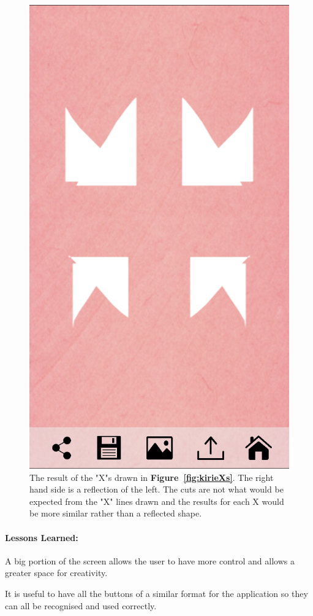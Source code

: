 \documentclass[11pt]{article}
\begin{document}
\begin{figure}[!ht]
\begin{minipage}{0.45\textwidth}
                            \includegraphics[width=0.7\linewidth]{Images/kirieCut.png}
                            \caption{The result of the "X"s drawn in \textbf{Figure~\ref{fig:kirieXs}}. The right hand side is a reflection of the left. The cuts are not what would be expected from the "X" lines drawn and the results for each X would be more similar rather than a reflected shape.}
                            \label{fig:kirieCut}
                        \end{minipage}
                    \end{figure}
                
                \paragraph{Lessons Learned:}   
                A big portion of the screen allows the user to have more control and allows a greater space for creativity.
                
                It is useful to have all the buttons of a similar format for the application so they can all be recognised and used correctly.
                
\end{document}
